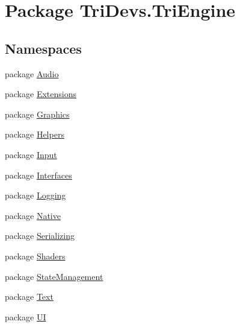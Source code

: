 \hypertarget{namespace_tri_devs_1_1_tri_engine}{\section{Package Tri\-Devs.\-Tri\-Engine}
\label{namespace_tri_devs_1_1_tri_engine}
}
\subsection*{Namespaces}
\begin{DoxyCompactItemize}
\item 
package \hyperlink{namespace_tri_devs_1_1_tri_engine_1_1_audio}{Audio}
\item 
package \hyperlink{namespace_tri_devs_1_1_tri_engine_1_1_extensions}{Extensions}
\item 
package \hyperlink{namespace_tri_devs_1_1_tri_engine_1_1_graphics}{Graphics}
\item 
package \hyperlink{namespace_tri_devs_1_1_tri_engine_1_1_helpers}{Helpers}
\item 
package \hyperlink{namespace_tri_devs_1_1_tri_engine_1_1_input}{Input}
\item 
package \hyperlink{namespace_tri_devs_1_1_tri_engine_1_1_interfaces}{Interfaces}
\item 
package \hyperlink{namespace_tri_devs_1_1_tri_engine_1_1_logging}{Logging}
\item 
package \hyperlink{namespace_tri_devs_1_1_tri_engine_1_1_native}{Native}
\item 
package \hyperlink{namespace_tri_devs_1_1_tri_engine_1_1_serializing}{Serializing}
\item 
package \hyperlink{namespace_tri_devs_1_1_tri_engine_1_1_shaders}{Shaders}
\item 
package \hyperlink{namespace_tri_devs_1_1_tri_engine_1_1_state_management}{State\-Management}
\item 
package \hyperlink{namespace_tri_devs_1_1_tri_engine_1_1_text}{Text}
\item 
package \hyperlink{namespace_tri_devs_1_1_tri_engine_1_1_u_i}{U\-I}
\end{DoxyCompactItemize}
